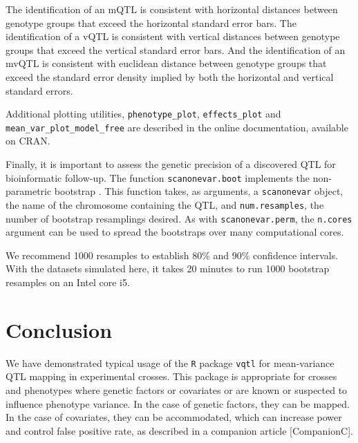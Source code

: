 \documentclass[9pt,twocolumn,twoside]{gsag3jnl}
\begin{document}
The identification of an mQTL is consistent with horizontal distances between genotype groups that exceed the horizontal standard error bars.
The identification of a vQTL is consistent with vertical distances between genotype groups that exceed the vertical standard error bars.
And the identification of an mvQTL is consistent with euclidean distance between genotype groups that exceed the standard error density implied by both the horizontal and vertical standard errors.

Additional plotting utilities, \texttt{phenotype\_plot}, \texttt{effects\_plot} and \texttt{mean\_var\_plot\_model\_free} are described in the online documentation, available on CRAN.

Finally, it is important to assess the genetic precision of a discovered QTL for bioinformatic follow-up.
The function \texttt{scanonevar.boot} implements the non-parametric bootstrap \cite{Visscher1996}.
This function takes, as arguments, a \texttt{scanonevar} object, the name of the chromosome containing the QTL, and \texttt{num.resamples}, the number of bootstrap resamplings desired.
As with \texttt{scanonevar.perm}, the \texttt{n.cores} argument can be used to spread the bootstraps over many computational cores.

We recommend 1000 resamples to establish 80\% and 90\% confidence intervals.
With the datasets simulated here, it takes 20 minutes to run 1000 bootstrap resamples on an Intel core i5.






\section*{Conclusion}

We have demonstrated typical usage of the \texttt{R} package \texttt{vqtl} for mean-variance QTL mapping in experimental crosses.
This package is appropriate for crosses and phenotypes where genetic factors or covariates or are known or suspected to influence phenotype variance.
In the case of genetic factors, they can be mapped.
In the case of covariates, they can be accommodated, which can increase power and control false positive rate, as described in a companion article [CompanionC].
\end{document}
